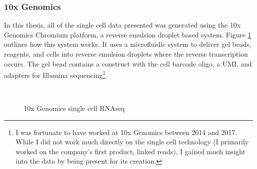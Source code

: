 \subsubsection{10x Genomics}

\par{
In this thesis, all of the single cell data presented was generated using the 10x Genomics Chromium platform, a reverse emulsion droplet based system. Figure \ref{figure:10xsinglecell} outlines how this system works. It uses a microfluidic system to deliver gel beads, reagents, and cells into reverse emulsion droplets where the reverse transcription occurs. The gel bead contains a construct with the cell barcode oligo, a UMI, and adapters for Illumina sequencing\cite{10xsinglecell}\footnote{I was fortunate to have worked at 10x Genomics between 2014 and 2017. While I did not work much directly on the single cell technology (I primarily worked on the company's first product, linked reads), I gained much insight into the data by being present for its creation.}.
}
\begin{figure}[htbp!]
\caption{10x Genomics single cell RNAseq}
\label{figure:10xsinglecell}
\begin{centering}
 \\
\end{centering}

\end{figure}

